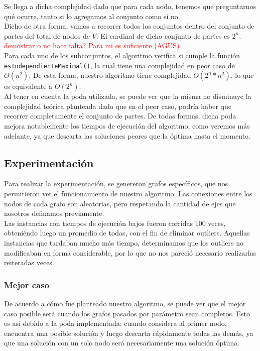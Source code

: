Se llega a dicha complejidad dado que para cada nodo, tenemos que preguntarnos qu\'e ocurre, tanto si lo agregamos al conjunto como si no.\\

Dicho de otra forma, vamos a recorrer todos los conjuntos dentro del conjunto de partes del total de nodos de $V$. El cardinal de dicho conjunto de partes es $2^n$. \textcolor{red}{demostrar o no hace falta? Para mi es suficiente (AGUS)}\\

Para cada uno de los subconjuntos, el algoritmo verifica si cumple la funci\'on \texttt{esIndependienteMaximal()}, la cual
tiene una complejidad en peor caso de $O(n^2)$.	De esta forma, nuestro algoritmo tiene complejidad $O(2^n * n^2)$, lo que es equivalente a $O(2^n)$.\\

Al tener en cuenta la poda utilizada, se puede ver que la misma no disminuye la complejidad te\'orica planteada dado que en el peor caso, podr\'ia haber que recorrer completamente el conjunto de partes.
De todas formas, dicha poda mejora notablemente los tiempos de ejecuci\'on del algoritmo, como veremos m\'as adelante, ya que descarta las soluciones peores que la \'optima hasta el momento.\\

\newpage
\subsection{Experimentaci\'on}
Para realizar la experimentaci\'on, se genereron grafos espec\'ificos, que nos permitieron ver el funcionamiento de nuestro algoritmo.
Las conexiones entre los nodos de cada grafo son aleatorias, pero respetando la cantidad de ejes que nosotros definamos previamente.\\

Las instancias con tiempos de ejecuci\'on bajos fueron corridas 100 veces, obteni\'endo luego un promedio de todas, con el fin de eliminar outliers.
Aquellas instancias que tardaban mucho m\'as tiempo, determinamos que los outliers no modificaban en forma considerable, por lo que no nos pareci\'o necesario realizarlas reiteradas veces.\\

\subsubsection{Mejor caso}
De acuerdo a c\'omo fue planteado nuestro algoritmo, se puede ver que el mejor caso posible ser\'a cuando los grafos pasados por par\'ametro sean completos.
Esto es as\'i debido a la poda implementada: cuando considera al primer nodo, encuentra una posible soluci\'on y luego descarta r\'apidamente todas las dem\'as, ya que una soluci\'on con un solo nodo 
ser\'a necesariamente una soluci\'on \'optima.\\

